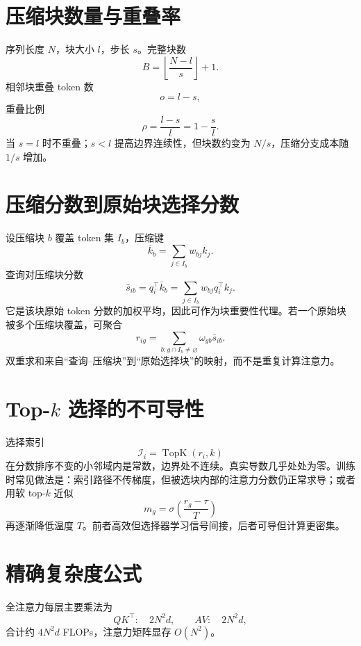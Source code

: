 \documentclass[UTF8,12pt,a4paper,fontset=none]{ctexart}
\numberwithin{equation}{section}
\begin{document}
\section{压缩块数量与重叠率}
序列长度 $N$，块大小 $l$，步长 $s$。完整块数
\begin{equation}
 B=\left\lfloor\frac{N-l}{s}\right\rfloor+1.
\end{equation}
相邻块重叠 token 数
\begin{equation}
 o=l-s,
\end{equation}
重叠比例
\begin{equation}
 \rho=\frac{l-s}{l}=1-\frac{s}{l}.
\end{equation}
当 $s=l$ 时不重叠；$s<l$ 提高边界连续性，但块数约变为 $N/s$，压缩分支成本随 $1/s$ 增加。

\section{压缩分数到原始块选择分数}
设压缩块 $b$ 覆盖 token 集 $I_b$，压缩键
\begin{equation}
 \bar k_b=\sum_{j\in I_b}w_{bj}k_j.
\end{equation}
查询对压缩块分数
\begin{equation}
 \bar s_{ib}=q_i^\top\bar k_b
 =\sum_{j\in I_b}w_{bj}q_i^\top k_j.
\end{equation}
它是该块原始 token 分数的加权平均，因此可作为块重要性代理。若一个原始块被多个压缩块覆盖，可聚合
\begin{equation}
 r_{ig}=\sum_{b:g\cap I_b\ne\varnothing}\omega_{gb}\bar s_{ib}.
\end{equation}
双重求和来自“查询--压缩块”到“原始选择块”的映射，而不是重复计算注意力。

\section{Top-$k$ 选择的不可导性}
选择索引
\begin{equation}
 \mathcal I_i=\operatorname{TopK}(r_i,k)
\end{equation}
在分数排序不变的小邻域内是常数，边界处不连续。真实导数几乎处处为零。训练时常见做法是：索引路径不传梯度，但被选块内部的注意力分数仍正常求导；或者用软 top-$k$ 近似
\begin{equation}
 m_g=\sigma\left(\frac{r_g-\tau}{T}\right)
\end{equation}
再逐渐降低温度 $T$。前者高效但选择器学习信号间接，后者可导但计算更密集。

\section{精确复杂度公式}
全注意力每层主要乘法为
\begin{equation}
 QK^\top: \quad 2N^2d,
 \qquad
 AV:\quad 2N^2d,
\end{equation}
合计约 $4N^2d$ FLOPs，注意力矩阵显存 $O(N^2)$。
\end{document}
